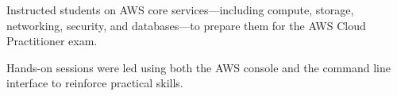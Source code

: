 \documentclass[letterpaper]{deedy-resume} %
\begin{document}
\begin{minipage}[t]{0.66\textwidth}




\vspace{\topsep} %
\begin{tightitemize}
\item Instructed students on AWS core services—including compute, storage, networking, security, and databases—to prepare them for the AWS Cloud Practitioner exam.
\item Hands-on sessions were led using both the AWS console and the command line interface to reinforce practical skills.
\end{tightitemize}

\sectionspace %





\end{minipage}
\end{document}
